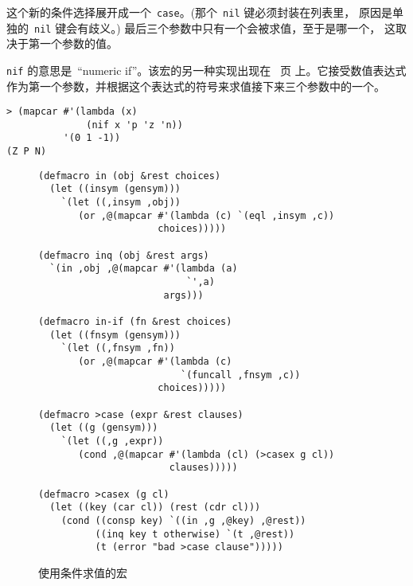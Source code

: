 这个新的条件选择展开成一个~\texttt{case}。(那个~\texttt{nil} 键必须封装在列表里，
原因是单独的~\texttt{nil} 键会有歧义。) 最后三个参数中只有一个会被求值，至于是哪一个，
这取决于第一个参数的值。

\texttt{nif} 的意思是~``numeric if''。该宏的另一种实现出现在~\pageref{mac:nif} 页
上。它接受数值表达式作为第一个参数，并根据这个表达式的符号来求值接下来三个参数中的一个。
\begin{lstlisting}
> (mapcar #'(lambda (x)
              (nif x 'p 'z 'n))
          '(0 1 -1))
(Z P N)
\end{lstlisting}
\begin{figure}
\begin{lstlisting}
(defmacro in (obj &rest choices)
  (let ((insym (gensym)))
    `(let ((,insym ,obj))
       (or ,@(mapcar #'(lambda (c) `(eql ,insym ,c))
                     choices)))))

(defmacro inq (obj &rest args)
  `(in ,obj ,@(mapcar #'(lambda (a)
                          `',a)
                      args)))

(defmacro in-if (fn &rest choices)
  (let ((fnsym (gensym)))
    `(let ((,fnsym ,fn))
       (or ,@(mapcar #'(lambda (c)
                         `(funcall ,fnsym ,c))
                     choices)))))

(defmacro >case (expr &rest clauses)
  (let ((g (gensym)))
    `(let ((,g ,expr))
       (cond ,@(mapcar #'(lambda (cl) (>casex g cl))
                       clauses)))))

(defmacro >casex (g cl)
  (let ((key (car cl)) (rest (cdr cl)))
    (cond ((consp key) `((in ,g ,@key) ,@rest))
          ((inq key t otherwise) `(t ,@rest))
          (t (error "bad >case clause")))))
\end{lstlisting}
  \caption{使用条件求值的宏}
  \label{fig:macros_for_conditional_evaluation_2}
\end{figure}

